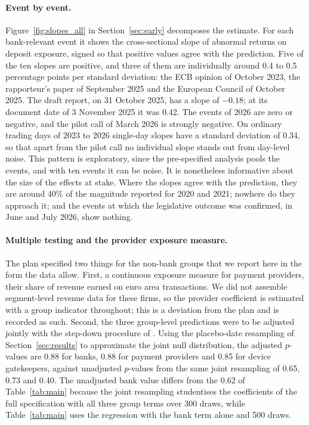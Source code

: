 \documentclass[11pt]{article}
\theoremstyle{plain}\newtheorem{proposition}{Proposition}
\begin{document}
\paragraph{Event by event.} Figure~\ref{fig:slopes_all} in Section~\ref{sec:early} decomposes the estimate. For each bank-relevant event it shows the cross-sectional slope of abnormal returns on deposit exposure, signed so that positive values agree with the prediction. Five of the ten slopes are positive, and three of them are individually around 0.4 to 0.5 percentage points per standard deviation: the ECB opinion of October 2023, the rapporteur's paper of September 2025 and the European Council of October 2025. The draft report, on 31 October 2025, has a slope of $-0.18$; at its document date of 3 November 2025 it was 0.42. The events of 2026 are zero or negative, and the pilot call of March 2026 is strongly negative. On ordinary trading days of 2023 to 2026 single-day slopes have a standard deviation of 0.34, so that apart from the pilot call no individual slope stands out from day-level noise. This pattern is exploratory, since the pre-specified analysis pools the events, and with ten events it can be noise. It is nonetheless informative about the size of the effects at stake. Where the slopes agree with the prediction, they are around 40\% of the magnitude reported for 2020 and 2021; nowhere do they approach it; and the events at which the legislative outcome was confirmed, in June and July 2026, show nothing.

\paragraph{Multiple testing and the provider exposure measure.} The plan specified two things for the non-bank groups that we report here in the form the data allow. First, a continuous exposure measure for payment providers, their share of revenue earned on euro area transactions. We did not assemble segment-level revenue data for these firms, so the provider coefficient is estimated with a group indicator throughout; this is a deviation from the plan and is recorded as such. Second, the three group-level predictions were to be adjusted jointly with the step-down procedure of \citet{romano2005}. Using the placebo-date resampling of Section~\ref{sec:results} to approximate the joint null distribution, the adjusted $p$-values are 0.88 for banks, 0.88 for payment providers and 0.85 for device gatekeepers, against unadjusted $p$-values from the same joint resampling of 0.65, 0.73 and 0.40. The unadjusted bank value differs from the 0.62 of Table~\ref{tab:main} because the joint resampling studentises the coefficients of the full specification with all three group terms over 300 draws, while Table~\ref{tab:main} uses the regression with the bank term alone and 500 draws.
\end{document}
